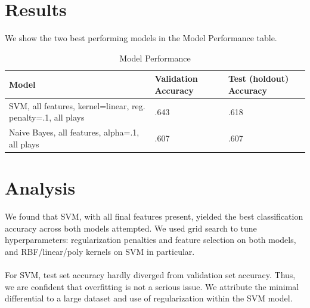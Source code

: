 \documentclass[letterpaper, 10 pt, conference]{ieeeconf}  %
\begin{document}
  \section{Results}
    We show the two best performing models in the Model Performance table.
    \begin{table}[h]
      \caption{Model Performance}
      \label{table_example}
      \begin{center}
        \begin{tabular}{| p{2cm}  | p{1.5cm} | p{1.5cm} |}
        \hline
        Model & Validation Accuracy & Test (holdout) Accuracy\\
        \hline
        SVM, all features, kernel=linear, reg. penalty=.1, all plays & .643 & .618\\
        \hline
        Naive Bayes, all features, alpha=.1, all plays & .607 & .607\\
        \hline
        \end{tabular}
      \end{center}
    \end{table}

  \section{Analysis}
  We found that SVM, with all final features present, yielded the best classification accuracy across both models attempted. We used grid search to tune hyperparameters: regularization penalties and feature selection on both models, and RBF/linear/poly kernels on SVM in particular. 
  \\
  \\
  For SVM, test set accuracy hardly diverged from validation set accuracy. Thus, we are confident that overfitting is not a serious issue. We attribute the minimal differential to a large dataset and use of regularization within the SVM model.
 
\end{document}
